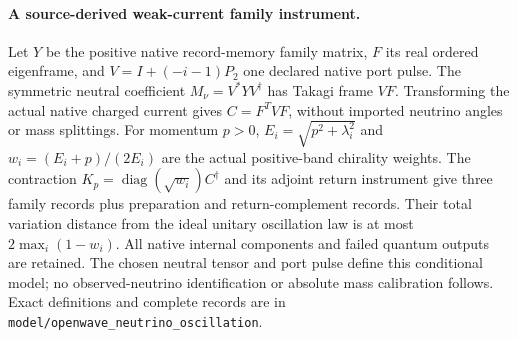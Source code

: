 \paragraph{A source-derived weak-current family instrument.}
Let $Y$ be the positive native record-memory family matrix, $F$ its real
ordered eigenframe, and $V=I+(-i-1)P_2$ one declared native port pulse.
The symmetric neutral coefficient $M_\nu=V^*YV^\dagger$ has Takagi frame
$VF$. Transforming the actual native charged current gives
$C=F^TVF$, without imported neutrino angles or mass splittings. For momentum
$p>0$, $E_i=\sqrt{p^2+\lambda_i^2}$ and
$w_i=(E_i+p)/(2E_i)$ are the actual positive-band chirality weights.
The contraction $K_p=\operatorname{diag}(\sqrt{w_i})C^\dagger$ and its
adjoint return instrument give three family records plus preparation and
return-complement records. Their total variation distance from the ideal
unitary oscillation law is at most $2\max_i(1-w_i)$.
All native internal components and failed quantum outputs are retained.
The chosen neutral tensor and port pulse define this conditional model;
no observed-neutrino identification or absolute mass calibration follows.
Exact definitions and complete records are in
\texttt{model/openwave\_neutrino\_oscillation}.
